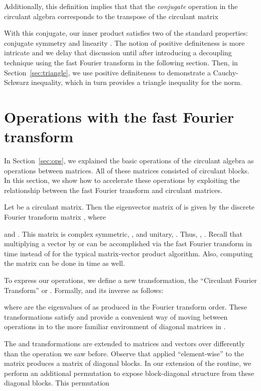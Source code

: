 \documentclass[1p,authoryear,letterpaper]{elsarticle}
\begin{document}
Additionally, this definition implies that that the \emph{conjugate}
operation in the circulant algebra corresponds to the transpose
of the circulant matrix

With this conjugate, our inner product
satisfies two of the standard properties: conjugate symmetry
 and
linearity .
The notion of positive definiteness is more intricate and we
delay that discussion until after introducing
a decoupling technique using the fast Fourier transform
in the following section.   Then, in Section~\ref{sec:triangle},
we use positive definiteness to
demonstrate a Cauchy-Schwarz inequality, which in turn
provides a triangle inequality for the norm.




\section{Operations with the fast Fourier transform}
\label{sec:fft}
In Section~\ref{sec:ops}, we explained the basic operations
of the circulant algebra as operations between matrices.
All of these matrices consisted of circulant blocks.
In this section, we show how to accelerate these operations
by exploiting the relationship between the fast Fourier transform and circulant matrices.

Let  be a  circulant
matrix. Then the
eigenvector matrix of  is given by the 
discrete Fourier transform matrix , where

and .
This matrix is complex symmetric, , and
unitary, .  Thus, ,
.
Recall that multiplying a vector by  or  can be
accomplished via the fast Fourier transform in
 time instead of 
for the typical matrix-vector product algorithm.  Also,
computing the matrix  can be done in time 
as well.

To express our operations, we define a new transformation,
the ``Circulant Fourier Transform'' or .  Formally,
 and its
inverse  as follows:

where  are the eigenvalues of  as produced
in the Fourier transform order.  These transformations satisfy
 and provide a convenient way of moving
between operations in  to the more familiar environment
of diagonal matrices in .

The  and  transformations are extended to matrices and
vectors over 
differently than the  operation we saw before.   Observe
that  applied ``element-wise'' to the  matrix produces a matrix
of diagonal blocks.  In our extension of the  routine,
we perform an additional permutation to expose
block-diagonal structure from these diagonal blocks.  This permutation
 
\end{document}
